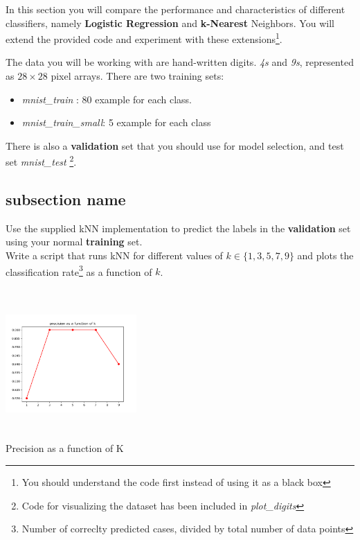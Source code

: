 \documentclass[a4paper]{tufte-handout}
\begin{document}
In this section you will compare the performance and characteristics of
different classifiers, namely \textbf{Logistic Regression} and
\textbf{k-Nearest} Neighbors. You will extend the provided code and experiment
with these extensions\footnote{You should understand the code first instead of
using it as a black box}.

The data you will be working with are hand-written digits. \emph{4s} and
\emph{9s}, represented as $28\times28$ pixel arrays. There are two training
sets: 

\begin{itemize}
  \item \emph{mnist\_train} : 80 example for each class.
  \item \emph{mnist\_train\_small}: 5 example for each class
\end{itemize}

There is also a \textbf{validation} set that you should use for model selection,
and test set \emph{mnist\_test} \footnote{Code for visualizing the dataset has
been included in \emph{plot\_digits}}.\\


\subsection{subsection name}%
\label{sub:subsection_name}

Use the supplied kNN implementation to predict the labels in the
\textbf{validation} set using your normal \textbf{training} set.\\

Write a script that runs kNN for different values of $k \in\{1,3,5,7,9\}$ and
plots the classification rate\footnote{Number of correclty predicted cases,
divided by total number of data points} as a function of $k$.

\inputminted[fontsize=\tiny]{python}{../hw1_code_python/knn_cross_validation.py}
\begin{marginfigure}
  \centering
  \includegraphics[width=5cm,height=5cm]{./../hw1_code_python/precisons_k.png}
  \caption{Precision as a function of K}
  \label{fig:precision}
\end{marginfigure}
\end{document}
